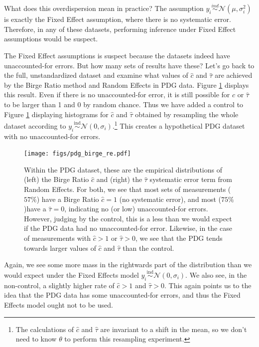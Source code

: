 \documentclass[12pt]{article}
\begin{document}
What does this overdispersion mean in practice? The assumption $y_i\overset{ind}{\sim} \mathcal{N}(\mu,\sigma_i^2)$ is exactly the Fixed Effect assumption, where there is no systematic error. Therefore, in any of these datasets, performing inference under Fixed Effect assumptions would be suspect.

The Fixed Effect assumptions is suspect because the datasets indeed have unaccounted-for errors. But how many sets of results have these? Let's go back to the full, unstandardized dataset and examine what values of $\hat c$ and $\hat \tau$ are achieved by the Birge Ratio method and Random Effects in PDG data. Figure \ref{fig:pdg-birge-re} displays this result. Even if there is no unaccounted-for error, it is still possible for $\hat c$ or $\hat \tau$ to be larger than 1 and 0 by random chance. Thus we have added a control to Figure \ref{fig:pdg-birge-re} displaying histograms for $\hat c$ and $\hat \tau$ obtained by resampling the whole dataset according to $y_i\overset{\mathrm{ind}}{\sim}\mathcal{N}(0, \sigma_i)$.\footnote{The calculations of $\hat c$ and $\hat \tau$ are invariant to a shift in the mean, so we don't need to know $\theta$ to perform this resampling experiment.} This creates a hypothetical PDG dataset with no unaccounted-for errors.

\begin{figure}[H]
\centering
\texttt{[image: figs/pdg\_birge\_re.pdf]}
\caption{Within the PDG dataset, these are the empirical distributions of (left) the Birge Ratio $\hat c$ and (right) the $\hat\tau$ systematic error term from Random Effects. For both, we see that most sets of measurements ($57\%$) have a Birge Ratio $\hat c=1$ (no systematic error), and most ($75\%$)have a $\hat\tau=0$, indicating no (or low) unaccounted-for errors. However, judging by the control, this is a less than we would expect if the PDG data had no unaccounted-for error. Likewise, in the case of measurements with $\hat c>1$ or $\hat\tau>0$, we see that the PDG tends towards larger values of $\hat c$ and $\hat\tau$ than the control.
}
\label{fig:pdg-birge-re}
\end{figure}


Again, we see some more mass in the rightwards part of the distribution than we would expect under the Fixed Effects model $y_i\overset{\mathrm{ind}}{\sim}\mathcal{N}(0, \sigma_i)$. We also see, in the non-control, a slightly higher rate of $\hat c >1$ and $\hat \tau > 0$. This again points us to the idea that the PDG data has some unaccounted-for errors, and thus the Fixed Effects model ought not to be used.
\end{document}
